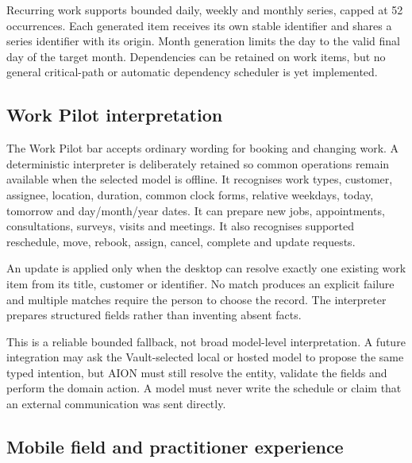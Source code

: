 Recurring work supports bounded daily, weekly and monthly series, capped at 52
occurrences.  Each generated item receives its own stable identifier and shares
a series identifier with its origin.  Month generation limits the day to the
valid final day of the target month.  Dependencies can be retained on work
items, but no general critical-path or automatic dependency scheduler is yet
implemented.

\subsection{Work Pilot interpretation}

The Work Pilot bar accepts ordinary wording for booking and changing work.  A
deterministic interpreter is deliberately retained so common operations remain
available when the selected model is offline.  It recognises work types,
customer, assignee, location, duration, common clock forms, relative weekdays,
today, tomorrow and day/month/year dates.  It can prepare new jobs, appointments,
consultations, surveys, visits and meetings.  It also recognises supported
reschedule, move, rebook, assign, cancel, complete and update requests.

An update is applied only when the desktop can resolve exactly one existing work
item from its title, customer or identifier.  No match produces an explicit
failure and multiple matches require the person to choose the record.  The
interpreter prepares structured fields rather than inventing absent facts.

This is a reliable bounded fallback, not broad model-level interpretation.  A
future integration may ask the Vault-selected local or hosted model to propose
the same typed intention, but AION must still resolve the entity, validate the
fields and perform the domain action.  A model must never write the schedule or
claim that an external communication was sent directly.

\subsection{Mobile field and practitioner experience}

